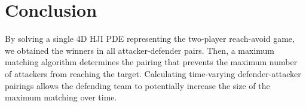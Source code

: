 \section{Conclusion} \label{sec:conc}
By solving a single 4D HJI PDE representing the two-player reach-avoid game, we obtained the winners in all attacker-defender pairs. Then, a maximum matching algorithm determines the pairing that prevents the maximum number of attackers from reaching the target.  Calculating time-varying defender-attacker pairings allows the defending team to potentially increase the size of the maximum matching over time.
